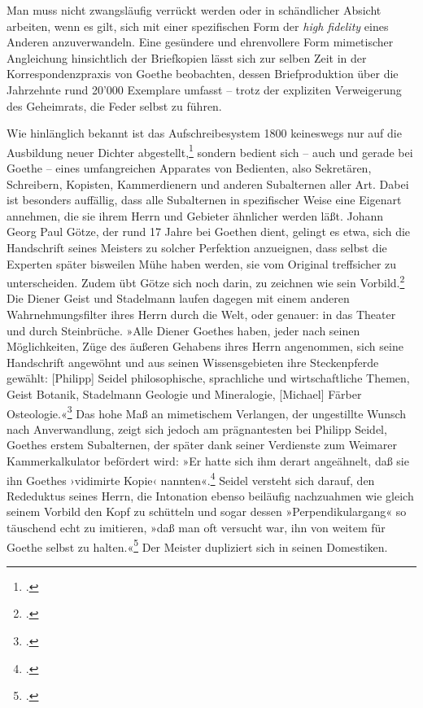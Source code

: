 \documentclass[a4paper,11pt]{article}
\newcommand{\anf}[1]{»#1«}
\newcommand{\inanf}[1]{›#1‹}
\begin{document}
Man muss nicht zwangsläufig verrückt werden oder in schändlicher Absicht arbeiten, wenn es gilt, sich mit einer spezifischen Form der \emph{high fidelity} eines Anderen anzuverwandeln. Eine gesündere und ehrenvollere Form mimetischer Angleichung hinsichtlich der Briefkopien lässt sich zur selben Zeit in der Korrespondenzpraxis von Goethe beobachten, dessen Briefproduktion über die Jahrzehnte rund 20'000 Exemplare umfasst – trotz der expliziten Verweigerung des Geheimrats, die Feder selbst zu führen. 

Wie hinlänglich bekannt ist das Aufschreibesystem 1800 keineswegs nur auf die Ausbildung neuer Dichter abgestellt,\footcite[]{kittler:1995a} sondern bedient sich – auch und gerade bei Goethe – eines umfangreichen Apparates von Bedienten, also Sekretären, Schreibern, Kopisten, Kammerdienern und anderen Subalternen aller Art. Dabei ist besonders auffällig, dass alle Subalternen in spezifischer Weise eine Eigenart annehmen, die sie ihrem Herrn und Gebieter ähnlicher werden läßt. Johann Georg Paul Götze, der rund 17 Jahre bei Goethen dient, gelingt es etwa, sich die Handschrift seines Meisters zu solcher Perfektion anzueignen, dass selbst die Experten später bisweilen Mühe haben werden, sie vom Original treffsicher zu unterscheiden. Zudem übt Götze sich noch darin, zu zeichnen wie sein Vorbild.\footcites[S.~100]{schleif:1965}[Mit dem Bestreben, die Handschrift des Herrn nachzuahmen, stehen Goethes Domestiken keineswegs allein. Auch in den Privatlabors im viktorianischen England, wo die Domestiken zu Laborassistenten werden, findet sich diese Tendenz, so etwa bei Sir William Crookes Diener: \anf{Even Giminghams handwriting became more like Crooke's.}][S.~330]{gay:1996} Die Diener Geist und Stadelmann laufen dagegen mit einem anderen Wahrnehmungsfilter ihres Herrn durch die Welt, oder genauer: in das Theater und durch Steinbrüche. \anf{Alle Diener Goethes haben, jeder nach seinen Möglichkeiten, Züge des äußeren Gehabens ihres Herrn angenommen, sich seine Handschrift angewöhnt und aus seinen Wissensgebieten ihre Steckenpferde gewählt: [Philipp] Seidel philosophische, sprachliche und wirtschaftliche Themen, Geist Botanik, Stadelmann Geologie und Mineralogie, [Michael] Färber Osteologie.}\footcite[S.~222]{schleif:1965} Das hohe Maß an mimetischem Verlangen, der ungestillte Wunsch nach Anverwandlung, zeigt sich jedoch am prägnantesten bei Philipp Seidel, Goethes erstem Subalternen, der später dank seiner Verdienste zum Weimarer Kammerkalkulator befördert wird: \anf{Er hatte sich ihm derart angeähnelt, daß sie ihn Goethes \inanf{vidimirte Kopie} nannten}.\footcite[S.~28]{schleif:1965} Seidel versteht sich darauf, den Rededuktus seines Herrn, die Intonation ebenso beiläufig nachzuahmen wie gleich seinem Vorbild den Kopf zu schütteln und sogar dessen \anf{Perpendikulargang} so täuschend echt zu imitieren, \anf{daß man oft versucht war, ihn von weitem für Goethe selbst zu halten.}\footcite[S.~47]{lyncker:1912} Der Meister dupliziert sich in seinen Domestiken. 
\end{document}
